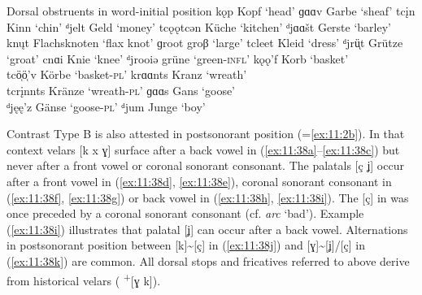 \ea%
\label{ex:11:37}Dorsal obstruents in word-initial position
\ea\label{ex:11:37a} kǫp \tab [kɔp] \tab Kopf \tab ‘head’ 
\ex\label{ex:11:37b} ɡɑɑv \tab [gɑːv] \tab Garbe \tab ‘sheaf’ 
\ex\label{ex:11:37c} tc\k{i}n \tab [çɪn] \tab Kinn \tab ‘chin’ 
\ex\label{ex:11:37d} ᵈjelt \tab [ʝelt] \tab Geld \tab ‘money’ 
\ex\label{ex:11:37e} tcǫǫtcən \tab [çɔːçən] \tab  Küche \tab ‘kitchen’ 
\ex\label{ex:11:37f} ᵈjɑɑšt \tab [ʝɑːʃt] \tab  Gerste \tab ‘barley’ 
\ex\label{ex:11:37g} knųt \tab [knʊt] \tab  Flachsknoten \tab ‘flax knot’ 
\ex\label{ex:11:37h} ɡroot \tab [groːt] \tab groβ \tab ‘large’ 
\ex\label{ex:11:37i} tcleet \tab [çleːt] \tab Kleid \tab ‘dress’ 
\ex\label{ex:11:37j} ᵈjrüͅt \tab [ʝrʏt] \tab Grütze \tab ‘groat’ 
\ex\label{ex:11:37k} cnɑi \tab [çnɑi] \tab  Knie \tab ‘knee’ 
\ex\label{ex:11:37l} ᵈjrooiə \tab [ʝroːiə] \tab grüne \tab ‘green-\textsc{infl}’ 
\ex\label{ex:11:37m} kǫǫ’f \tab [kɔːf] \tab Korb \tab ‘basket’ \\
    tcö̜ö̜’v \tab [çœːv] \tab Körbe \tab ‘basket-\textsc{pl}’ 
\ex\label{ex:11:37n} krɑɑnts \tab [krɑːnts] \tab Kranz \tab ‘wreath’ \\
    tcr\k{i}nnts \tab [çrɪnts] \tab Kränze \tab ‘wreath-\textsc{pl}’ 
\ex\label{ex:11:37o} ɡɑɑs \tab [gɑːs] \tab Gans \tab ‘goose’ \\
    ᵈjęę’z \tab [ʝɛːz] \tab Gänse \tab ‘goose-\textsc{pl}’ 
\ex\label{ex:11:37p} ᵈjum \tab [ʝum] \tab Junge \tab ‘boy’ 
\z 
\z 

Contrast Type B is also attested in postsonorant position (=\ref{ex:11:2b}). In that context velars [k x ɣ] surface after a back vowel in (\ref{ex:11:38a}--\ref{ex:11:38c}) but never after a front vowel or coronal sonorant consonant. The palatals [ç ʝ] occur after a front vowel in (\ref{ex:11:38d}, \ref{ex:11:38e}), coronal sonorant consonant in (\ref{ex:11:38f}, \ref{ex:11:38g}) or back vowel in (\ref{ex:11:38h}, \ref{ex:11:38i}). The [ç] in  was once preceded by a coronal sonorant consonant (cf.  \textit{arc} ‘bad’). Example (\ref{ex:11:38i}) illustrates that palatal [ʝ] can occur after a back vowel. Alternations in postsonorant position between [k]{\textasciitilde}[ç] in (\ref{ex:11:38j}) and [ɣ]{\textasciitilde}[ʝ]/[ç] in (\ref{ex:11:38k}) are common. All dorsal stops and fricatives referred to above derive from historical velars ( \textsuperscript{+}[ɣ k]).\largerpage[2]

